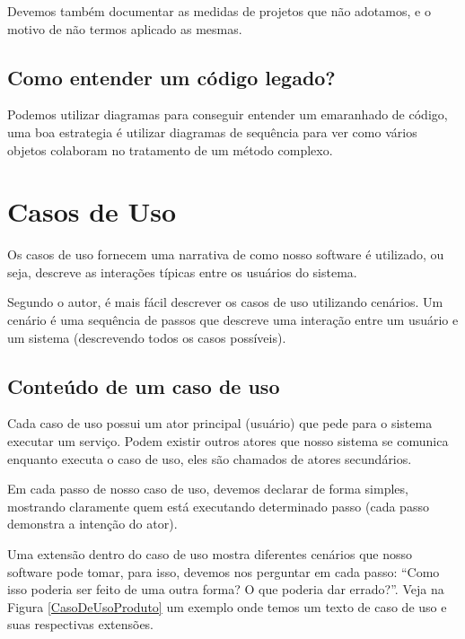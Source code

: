 \documentclass[a4paper, 12pt]{report}
\begin{document}
	Devemos também documentar as medidas de projetos que não adotamos, e o motivo de não termos aplicado as mesmas.


	\section{Como entender um código legado?}
	
	Podemos utilizar diagramas para conseguir entender um emaranhado de código, uma boa estrategia é utilizar diagramas de sequência para ver como vários objetos colaboram no tratamento de um método complexo.
	
	
	{\let\clearpage\relax \chapter{Casos de Uso}}
	
	Os casos de uso fornecem uma narrativa de como nosso software é utilizado, ou seja, descreve as interações típicas entre os usuários do sistema.
	
	Segundo o autor, é mais fácil descrever os casos de uso utilizando cenários. Um cenário é uma sequência de passos que descreve uma interação entre um usuário e um sistema (descrevendo todos os casos possíveis).
	
	\section{Conteúdo de um caso de uso}
	
	Cada caso de uso possui um ator principal (usuário) que pede para o sistema executar um serviço. Podem existir outros atores que nosso sistema se comunica enquanto executa o caso de uso, eles são chamados de atores secundários.
	
	Em cada passo de nosso caso de uso, devemos declarar de forma simples, mostrando claramente quem está executando determinado passo (cada passo demonstra a intenção do ator).
	
	Uma extensão dentro do caso de uso mostra diferentes cenários que nosso software pode tomar, para isso, devemos nos perguntar em cada passo: ``Como isso poderia ser feito de uma outra forma? O que poderia dar errado?''. Veja na Figura \ref{CasoDeUsoProduto} um exemplo onde temos um texto de caso de uso e suas respectivas extensões.
	
\end{document}
